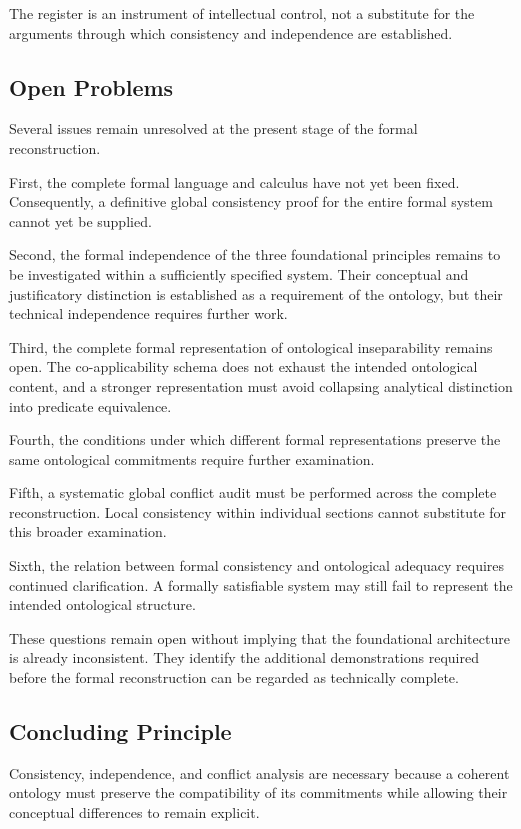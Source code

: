 The register is an instrument of intellectual control,
not a substitute for the arguments through which
consistency and independence are established.

\subsection{Open Problems}

Several issues remain unresolved at the present stage
of the formal reconstruction.

First, the complete formal language and calculus have
not yet been fixed. Consequently, a definitive global
consistency proof for the entire formal system cannot
yet be supplied.

Second, the formal independence of the three foundational
principles remains to be investigated within a sufficiently
specified system. Their conceptual and justificatory
distinction is established as a requirement of the
ontology, but their technical independence requires
further work.

Third, the complete formal representation of ontological
inseparability remains open. The co-applicability schema
does not exhaust the intended ontological content, and
a stronger representation must avoid collapsing
analytical distinction into predicate equivalence.

Fourth, the conditions under which different formal
representations preserve the same ontological commitments
require further examination.

Fifth, a systematic global conflict audit must be
performed across the complete reconstruction. Local
consistency within individual sections cannot substitute
for this broader examination.

Sixth, the relation between formal consistency and
ontological adequacy requires continued clarification.
A formally satisfiable system may still fail to represent
the intended ontological structure.

These questions remain open without implying that the
foundational architecture is already inconsistent.
They identify the additional demonstrations required
before the formal reconstruction can be regarded as
technically complete.

\subsection{Concluding Principle}

Consistency, independence, and conflict analysis are
necessary because a coherent ontology must preserve
the compatibility of its commitments while allowing
their conceptual differences to remain explicit.

